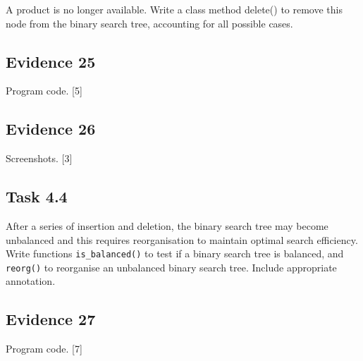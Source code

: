 A product is no longer available. Write a class method delete() to
remove this node from the binary search tree, accounting for all possible
cases. 

\subsection*{Evidence 25 }

Program code. \hfill{} {[}5{]}

\subsection*{Evidence 26 }

Screenshots. \hfill{} {[}3{]}

\subsection*{Task 4.4 }

After a series of insertion and deletion, the binary search tree may
become unbalanced and this requires reorganisation to maintain optimal
search efficiency. Write functions \texttt{is\_balanced()} to test
if a binary search tree is balanced, and \texttt{reorg()} to reorganise
an unbalanced binary search tree. Include appropriate annotation.

\subsection*{Evidence 27 }

Program code. \hfill{}{[}7{]}